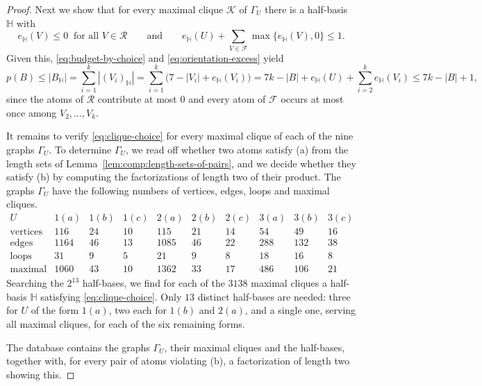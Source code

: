 \documentclass[a4paper, 10pt]{amsart}
\theoremstyle{plain}
\theoremstyle{definition}
\theoremstyle{definition}
\newcommand{\code}[1]{\texttt{\detokenize{#1}}}
\numberwithin{equation}{section}
\begin{document}
\begin{proof}
Next we show that for every maximal
clique $\mathcal K$ of $\Gamma_U$ there is a half-basis $\mathbb H$ with
\begin{equation}
 e_{\mathbb H} (V) \le 0 \ \text{ for all } V \in \mathcal R
 \qquad \text{and} \qquad
 e_{\mathbb H} (U) + \sum_{V \in \mathcal F} \max \{ e_{\mathbb H} (V), 0 \} \le 1 . \label{eq:clique-choice}
\end{equation}
Given this, \eqref{eq:budget-by-choice} and \eqref{eq:orientation-excess}
yield
\[
 p(B) \le |B_{\mathbb H}| = \sum_{i=1}^k |(V_i)_{\mathbb H}| = \sum_{i=1}^k \bigl( 7 - |V_i| + e_{\mathbb H} (V_i) \bigr)
 = 7k - |B| + e_{\mathbb H} (U) + \sum_{i=2}^k e_{\mathbb H} (V_i) \le 7k - |B| + 1 ,
\]
since the atoms of $\mathcal R$ contribute at most $0$ and every atom of
$\mathcal F$ occurs at most once among $V_2, \ldots, V_k$.

It remains to verify \eqref{eq:clique-choice} for every maximal clique of
each of the nine graphs $\Gamma_U$.  To determine $\Gamma_U$, we read off
whether two atoms satisfy (a) from the length sets of
Lemma~\ref{lem:comp:length-sets-of-pairs}, and we decide whether they satisfy
(b) by computing the factorizations of length two of their product.  The
graphs $\Gamma_U$ have the following numbers of vertices, edges, loops and
maximal cliques.
\[
\begin{array}{c|ccccccccc}
 U & 1(a) & 1(b) & 1(c) & 2(a) & 2(b) & 2(c) & 3(a) & 3(b) & 3(c)\\ \hline
 \text{vertices} & 116 & 24 & 10 & 115 & 21 & 14 & 54 & 49 & 16\\
 \text{edges} & 1164 & 46 & 13 & 1085 & 46 & 22 & 288 & 132 & 38\\
 \text{loops} & 31 & 9 & 5 & 21 & 9 & 8 & 18 & 16 & 8\\
 \text{maximal cliques} & 1060 & 43 & 10 & 1362 & 33 & 17 & 486 & 106 & 21
\end{array}
\]
Searching the $2^{13}$ half-bases, we find for each of the $3138$ maximal
cliques a half-basis $\mathbb H$ satisfying \eqref{eq:clique-choice}.  Only
$13$ distinct half-bases are needed: three for $U$ of the form $1(a)$, two
each for $1(b)$ and $2(a)$, and a single one, serving all maximal cliques,
for each of the six remaining forms.

The database \code{length-two-atoms.jsonl} contains the graphs $\Gamma_U$,
their maximal cliques and the half-bases, together with, for every pair of
atoms violating (b), a factorization of length two showing this.
\end{proof}
\end{document}
